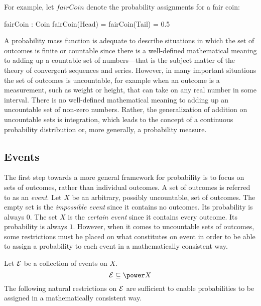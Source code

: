 \documentclass{article}
\begin{document}
\newcommand{\realonehalf}{0.5}


For example, let $fairCoin$ denote the probability assignments for a fair coin:
\begin{axdef}
	fairCoin : Coin
\where
	fairCoin(Head) = fairCoin(Tail) = \realonehalf
\end{axdef}

A probability mass function is adequate to describe situations in which the set of outcomes is finite or countable since there is a well-defined
mathematical meaning to adding up a countable set of numbers---that is the subject matter of the theory of convergent sequences and series.
However, in many important situations the set of outcomes is uncountable, for example when an outcome is a measurement,
such as weight or height, that can take on any real number in some interval. 
There is no well-defined mathematical meaning to adding up an uncountable set of non-zero numbers.
Rather, the generalization of addition on uncountable sets is integration, which leads to the concept of a continuous probability distribution or, more generally, a probability measure.

\subsection{Events}

The first step towards a more general framework for probability is to focus on sets of outcomes, rather than individual outcomes.
A set of outcomes is referred to as an {\it event}. 
Let $X$ be an arbitrary, possibly uncountable, set of outcomes.
The empty set is the {\it impossible event} since it contains no outcomes. Its probability is always $0$.
The set $X$ is the {\it certain event} since it contains every outcome. Its probability is always $1$.
However, when it comes to uncountable sets of outcomes, some restrictions must be placed on what constitutes on event in order to be able to
assign a probability to each event in a mathematically consistent way.

\newcommand{\calE}{{\cal E}}

Let $\cal E$ be a collection of events on $X$.
\begin{equation}
	{\cal E} \subseteq \power X
\end{equation}
The following natural restrictions on $\cal E$ are sufficient to enable probabilities to be assigned in a mathematically consistent way.
\end{document}

